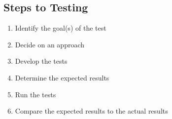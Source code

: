 \subsection[Steps to Testing]{Steps to Testing
      \citep[p.~443]{PetersAndPedrycz2000}}
\begin{enumerate}
      \item Identify the goal(s) of the test
      \item Decide on an approach
      \item Develop the tests
      \item Determine the expected results
      \item Run the tests
      \item Compare the expected results to the actual results
\end{enumerate}

